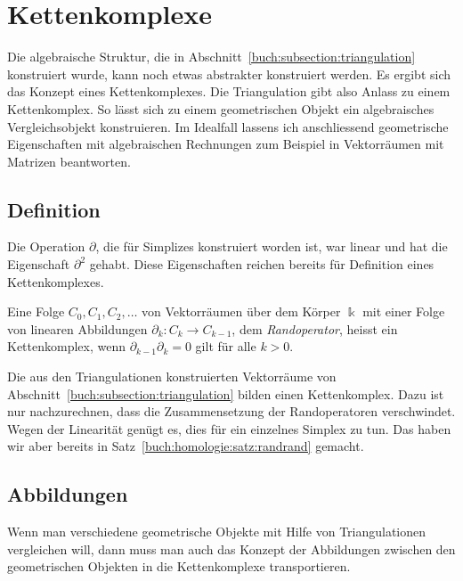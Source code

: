 %
%
%
\section{Kettenkomplexe
\label{buch:section:komplex}}
Die algebraische Struktur, die in Abschnitt~\ref{buch:subsection:triangulation}
konstruiert wurde, kann noch etwas abstrakter konstruiert werden.
Es ergibt sich das Konzept eines Kettenkomplexes.
Die Triangulation gibt also Anlass zu einem Kettenkomplex.
So lässt sich zu einem geometrischen Objekt ein algebraisches 
Vergleichsobjekt konstruieren.
Im Idealfall lassens ich anschliessend geometrische Eigenschaften mit
algebraischen Rechnungen zum Beispiel in Vektorräumen mit Matrizen
beantworten.

\subsection{Definition
\label{buch:subsection:kettenkomplex-definition}}
Die Operation $\partial$, die für Simplizes konstruiert worden ist,
war linear und hat die Eigenschaft $\partial^2$ gehabt.
Diese Eigenschaften reichen bereits für Definition eines Kettenkomplexes.

\begin{definition}
Eine Folge $C_0,C_1,C_2,\dots$ von Vektorräumen über dem Körper $\Bbbk$
mit einer Folge von linearen Abbildungen
$\partial_k\colon C_k \to C_{k-1}$, dem {\em Randoperator},
heisst ein Kettenkomplex, wenn $\partial_{k-1}\partial_k=0$ gilt
für alle $k>0$.
\end{definition}

Die aus den Triangulationen konstruierten Vektorräume von
Abschnitt~\ref{buch:subsection:triangulation} bilden einen
Kettenkomplex.
Dazu ist nur nachzurechnen, dass die Zusammensetzung der
Randoperatoren verschwindet.
Wegen der Linearität genügt es, dies für ein einzelnes Simplex zu tun.
Das haben wir aber bereits in Satz~\ref{buch:homologie:satz:randrand}
gemacht.

\subsection{Abbildungen
\label{buch:subsection:abbildungen}}
Wenn man verschiedene geometrische Objekte mit Hilfe von Triangulationen
vergleichen will, dann muss man auch das Konzept der Abbildungen zwischen
den geometrischen Objekten in die Kettenkomplexe transportieren.

